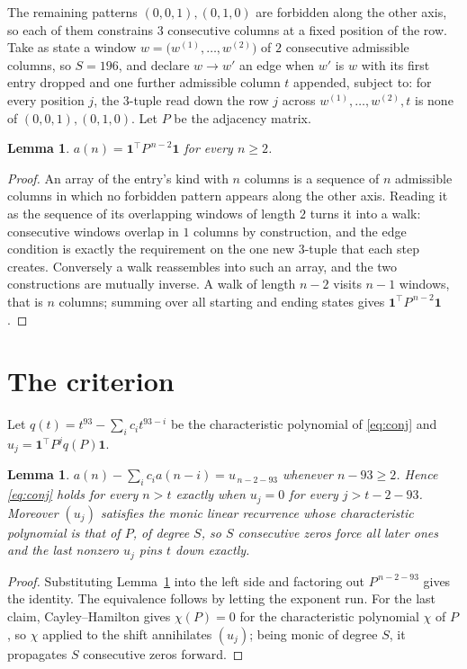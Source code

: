 \documentclass[11pt,a4paper]{article}
\theoremstyle{plain}
\newtheorem{lemma}[theorem]{Lemma}
\theoremstyle{definition}
\begin{document}
The remaining patterns $(0,0,1), (0,1,0)$ are forbidden along the other axis, so each of them
constrains $3$ consecutive columns at a fixed position of the row. Take as state a
window $w=\bigl(w^{(1)},\dots,w^{(2)}\bigr)$ of $2$ consecutive admissible
columns, so $S=196$, and declare $w\to w'$ an edge when $w'$ is $w$ with its first entry
dropped and one further admissible column $t$ appended, subject to: for every position
$j$, the $3$-tuple read down the row $j$ across $w^{(1)},\dots,w^{(2)},t$
is none of $(0,0,1), (0,1,0)$. Let $P$ be the adjacency matrix.

\begin{lemma}\label{lem:walk}
$a(n)=\mathbf{1}^{\!\top}P^{\,n-2}\mathbf{1}$ for every $n\ge2$.
\end{lemma}

\begin{proof}
An array of the entry's kind with $n$ columns is a sequence of $n$ admissible columns in
which no forbidden pattern appears along the other axis. Reading it as the sequence of its
overlapping windows of length $2$ turns it into a walk: consecutive windows overlap in
$1$ columns by construction, and the edge condition is exactly the requirement on the one
new $3$-tuple that each step creates. Conversely a walk reassembles into such an array,
and the two constructions are mutually inverse. A walk of length $n-2$ visits $n-1$
windows, that is $n$ columns; summing over all starting and ending states gives
$\mathbf{1}^{\!\top}P^{\,n-2}\mathbf{1}$.
\end{proof}

\section{The criterion}

Let $q(t)=t^{93}-\sum_i c_i t^{93-i}$ be the characteristic polynomial of
\eqref{eq:conj} and $u_j=\mathbf{1}^{\!\top}P^{j}q(P)\mathbf{1}$.

\begin{lemma}\label{lem:crit}
$a(n)-\sum_i c_i a(n-i)=u_{\,n-2-93}$ whenever $n-93\ge2$. Hence
\eqref{eq:conj} holds for every $n>t$ exactly when $u_j=0$ for every
$j>t-2-93$. Moreover $(u_j)$ satisfies the monic linear recurrence whose
characteristic polynomial is that of $P$, of degree $S$, so $S$ consecutive zeros force all
later ones and the last nonzero $u_j$ pins $t$ down exactly.
\end{lemma}

\begin{proof}
Substituting Lemma~\ref{lem:walk} into the left side and factoring out
$P^{\,n-2-93}$ gives the identity. The equivalence follows by letting the exponent
run. For the last claim, Cayley--Hamilton gives $\chi(P)=0$ for the characteristic
polynomial $\chi$ of $P$, so $\chi$ applied to the shift annihilates $(u_j)$; being monic of
degree $S$, it propagates $S$ consecutive zeros forward.
\end{proof}
\end{document}
